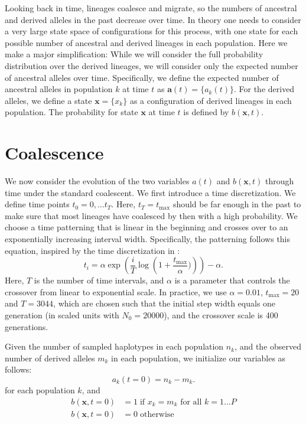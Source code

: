 \documentclass[a4paper]{article}
\begin{document}
Looking back in time, lineages coalesce and migrate, so the numbers of ancestral and derived alleles in the past decrease over time. In theory one needs to consider a very large state space of configurations for this process, with one state for each possible number of ancestral and derived lineages in each population. Here we make a major simplification: While we will consider the full probability distribution over the derived lineages, we will consider only the expected number of ancestral alleles over time. Specifically, we define the expected number of ancestral alleles in population $k$ at time $t$ as $\mathbf{a}(t)=\{a_k(t)\}$. For the derived alleles, we define a state $\mathbf{x}=\{x_k\}$ as a configuration of derived lineages in each population. The probability for state $\mathbf{x}$ at time $t$ is defined by  $b(\mathbf{x},t)$.

\section{Coalescence}

We now consider the evolution of the two variables $a(t)$ and $b(\mathbf{x}, t)$ through time under the standard coalescent. We first introduce a time discretization. We define time points $t_0=0,\ldots t_T$. Here, $t_T=t_\mathrm{max}$ should be far enough in the past to make sure that most lineages have coalesced by then with a high probability. We choose a time patterning that is linear in the beginning and crosses over to an exponentially increasing interval width. Specifically, the patterning follows this equation, inspired by the time discretization in \cite{Li:2011eza}:
\begin{equation}
    t_i=\alpha \exp\left(\frac{i}{T} \log\left(1 + \frac{t_\mathrm{max}}{\alpha})\right)\right) - \alpha.
\end{equation}
Here, $T$ is the number of time intervals, and $\alpha$ is a parameter that controls the crossover from linear to exponential scale. In practice, we use $\alpha=0.01$, $t_\mathrm{max}=20$ and $T=3044$, which are chosen such that the initial step width equals one generation (in scaled units with $N_0=20000$), and the crossover scale is 400 generations.

Given the number of sampled haplotypes in each population $n_k$, and the observed number of derived alleles $m_k$ in each population, we initialize our variables as follows:
\begin{equation}
    a_k(t=0) = n_k - m_k.
\end{equation}
for each population $k$, and
\begin{align}
    b(\mathbf{x},t=0) &= 1 \;\text{if $x_k=m_k$ for all $k=1 \ldots P$}\\
    b(\mathbf{x},t=0) &= 0 \;\text{otherwise}
\end{align}
\end{document}
